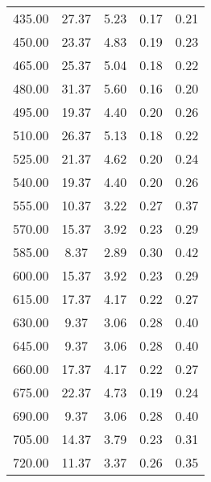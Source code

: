 \begin{table}
\begin{tabular}{S S S S S }
435.00  & 27.37  & 5.23  & 0.17  & 0.21\\ 
450.00  & 23.37  & 4.83  & 0.19  & 0.23\\ 
465.00  & 25.37  & 5.04  & 0.18  & 0.22\\ 
480.00  & 31.37  & 5.60  & 0.16  & 0.20\\ 
495.00  & 19.37  & 4.40  & 0.20  & 0.26\\ 
510.00  & 26.37  & 5.13  & 0.18  & 0.22\\ 
525.00  & 21.37  & 4.62  & 0.20  & 0.24\\ 
540.00  & 19.37  & 4.40  & 0.20  & 0.26\\ 
555.00  & 10.37  & 3.22  & 0.27  & 0.37\\ 
570.00  & 15.37  & 3.92  & 0.23  & 0.29\\ 
585.00  & 8.37  & 2.89  & 0.30  & 0.42\\ 
600.00  & 15.37  & 3.92  & 0.23  & 0.29\\ 
615.00  & 17.37  & 4.17  & 0.22  & 0.27\\ 
630.00  & 9.37  & 3.06  & 0.28  & 0.40\\ 
645.00  & 9.37  & 3.06  & 0.28  & 0.40\\ 
660.00  & 17.37  & 4.17  & 0.22  & 0.27\\ 
675.00  & 22.37  & 4.73  & 0.19  & 0.24\\ 
690.00  & 9.37  & 3.06  & 0.28  & 0.40\\ 
705.00  & 14.37  & 3.79  & 0.23  & 0.31\\ 
720.00  & 11.37  & 3.37  & 0.26  & 0.35\\ 
\bottomrule 
\end{tabular} 
\end{table}